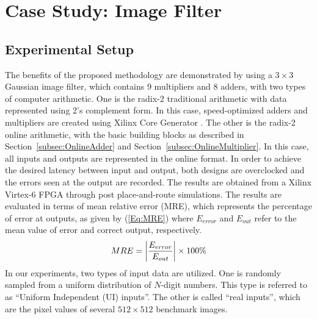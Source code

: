 \documentclass{acm_proc_article-sp}
\begin{document}
\section{Case Study: Image Filter}\label{Sec:CaseStudy}
\subsection{Experimental Setup}
The benefits of the proposed methodology are demonstrated by using a $3\times3$ Gaussian image filter, which contains 9 multipliers and 8 adders, with two types of computer arithmetic. One is the radix-2 traditional arithmetic with data represented using 2's complement form. In this case, speed-optimized adders and multipliers are created using Xilinx Core Generator \cite{XilinxMult}. The other is the radix-2 online arithmetic, with the basic building blocks as described in Section~\ref{subsec:OnlineAdder} and Section~\ref{subsec:OnlineMultiplier}. In this case, all inputs and outputs are represented in the online format. In order to achieve the desired latency between input and output, both designs are overclocked and the errors seen at the output are recorded. The results are obtained from a Xilinx Virtex-6 FPGA through post place-and-route simulations. The results are evaluated in terms of mean relative error (MRE), which represents the percentage of error at outputs, as given by (\ref{Eq:MRE}) where $E_{error}$ and $E_{out}$ refer to the mean value of error and correct output, respectively.
%
\begin{eqnarray}\label{Eq:MRE}
\scriptsize
  MRE=\left|\frac{E_{error}}{E_{out}}\right|\times100\%
\end{eqnarray}
\normalsize
%
In our experiments, two types of input data are utilized. One is randomly sampled from a uniform distribution of $N$-digit numbers. This type is referred to as ``Uniform Independent (UI) inputs''. The other is called ``real inputs'', which are the pixel values of several $512\times512$ benchmark images.

\vspace{-1ex}
\end{document}
